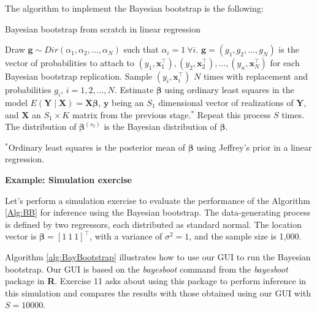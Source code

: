 The algorithm to implement the Bayesian bootstrap is the following:
\begin{algorithm}[!h]
	\caption{Bayesian bootstrap from scratch in linear regression}
	\label{Alg:BB}
	\begin{algorithmic}[1]
		\State Draw $\bm{g}\sim Dir(\alpha_1,\alpha_2,\dots,\alpha_N)$ such that $\alpha_i=1 \ \forall i$.
		\State $\bm{g}=(g_1,g_2,\dots,g_N)$ is the vector of probabilities to attach to $(y_1,\bm{x}_1^{\top}),(y_2,\bm{x}_2^{\top}),\dots,(y_n,\bm{x}_N^{\top})$ for each Bayesian bootstrap replication.
		\State Sample $(y_i,\bm{x}_i^{\top})$ $N$ times with replacement and probabilities $g_i$, $i=1,2,\dots,N$.
		\State Estimate $\bm{\beta}$ using ordinary least squares in the model $E(\bm{Y}\mid \bm{X})=\bm{X}\bm{\beta}$, $\bm{y}$ being an $S_1$ dimensional vector of realizations of $\bm{Y}$, and $\bm{X}$ an $S_1\times K$ matrix from the previous stage.$^*$ 
		\State Repeat this process $S$ times.
		\State The distribution of $\bm{\beta}^{(s_2)}$ is the Bayesian distribution of $\bm{\beta}$.		
	\end{algorithmic}
	$^*${\footnotesize{Ordinary least squares is the posterior mean of $\bm{\beta}$ using Jeffrey's prior in a linear regression.}}
\end{algorithm}

\textbf{Example: Simulation exercise}

Let's perform a simulation exercise to evaluate the performance of the Algorithm \ref{Alg:BB} for inference using the Bayesian bootstrap. The data-generating process is defined by two regressors, each distributed as standard normal. The location vector is $\bm{\beta} = \left[1 \ 1 \ 1\right]^{\top}$, with a variance of $\sigma^2 = 1$, and the sample size is 1,000.

Algorithm \ref{alg:BayBootstrap} illustrates how to use our GUI to run the Bayesian bootstrap. Our GUI is based on the \textit{bayesboot} command from the \textit{bayesboot} package in \textbf{R}. Exercise 11 asks about using this package to perform inference in this simulation and compares the results with those obtained using our GUI with $S = 10000$.

